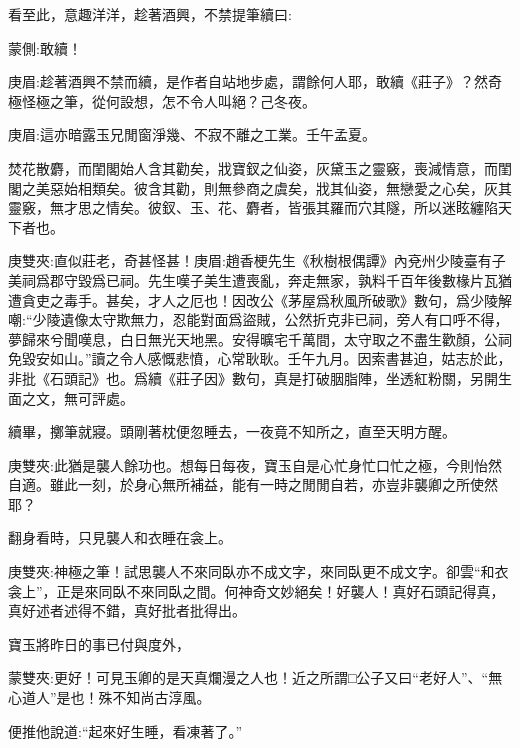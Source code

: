 \begin{parag}
    看至此，意趣洋洋，趁著酒興，不禁提筆續曰:\begin{note}蒙側:敢續！\end{note}\begin{note}庚眉:趁著酒興不禁而續，是作者自站地步處，謂餘何人耶，敢續《莊子》？然奇極怪極之筆，從何設想，怎不令人叫絕？己冬夜。\end{note}\begin{note}庚眉:這亦暗露玉兄閒窗淨幾、不寂不離之工業。壬午孟夏。\end{note}
\end{parag}


\begin{qute2sp}

    焚花散麝，而閨閣始人含其勸矣，戕寶釵之仙姿，灰黛玉之靈竅，喪減情意，而閨閣之美惡始相類矣。彼含其勸，則無參商之虞矣，戕其仙姿，無戀愛之心矣，灰其靈竅，無才思之情矣。彼釵、玉、花、麝者，皆張其羅而穴其隧，所以迷眩纏陷天下者也。\begin{note}庚雙夾:直似莊老，奇甚怪甚！庚眉:趙香梗先生《秋樹根偶譚》內兗州少陵臺有子美祠爲郡守毀爲已祠。先生嘆子美生遭喪亂，奔走無家，孰料千百年後數椽片瓦猶遭貪吏之毒手。甚矣，才人之厄也！因改公《茅屋爲秋風所破歌》數句，爲少陵解嘲:“少陵遺像太守欺無力，忍能對面爲盜賊，公然折克非已祠，旁人有口呼不得，夢歸來兮聞嘆息，白日無光天地黑。安得曠宅千萬間，太守取之不盡生歡顏，公祠免毀安如山。”讀之令人感慨悲憤，心常耿耿。壬午九月。因索書甚迫，姑志於此，非批《石頭記》也。爲續《莊子因》數句，真是打破胭脂陣，坐透紅粉關，另開生面之文，無可評處。\end{note}
\end{qute2sp}


\begin{parag}
    續畢，擲筆就寢。頭剛著枕便忽睡去，一夜竟不知所之，直至天明方醒。\begin{note}庚雙夾:此猶是襲人餘功也。想每日每夜，寶玉自是心忙身忙口忙之極，今則怡然自適。雖此一刻，於身心無所補益，能有一時之閒閒自若，亦豈非襲卿之所使然耶？\end{note}翻身看時，只見襲人和衣睡在衾上。\begin{note}庚雙夾:神極之筆！試思襲人不來同臥亦不成文字，來同臥更不成文字。卻雲“和衣衾上”，正是來同臥不來同臥之間。何神奇文妙絕矣！好襲人！真好石頭記得真，真好述者述得不錯，真好批者批得出。\end{note}寶玉將昨日的事已付與度外，\begin{note}蒙雙夾:更好！可見玉卿的是天真爛漫之人也！近之所謂□公子又曰“老好人”、“無心道人”是也！殊不知尚古淳風。\end{note}便推他說道:“起來好生睡，看凍著了。”
\end{parag}


